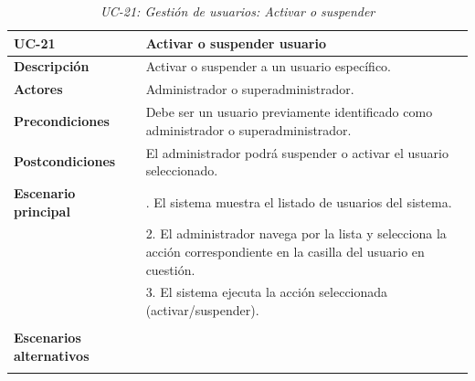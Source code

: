 \begin{table}
  \begin{center}
    \begin{tabularx}{16.4cm}{|l|X|}
      \hline
      \textbf{UC-21} & \textbf{Activar o suspender usuario}\\
      \hline
      \textbf{Descripción} & Activar o suspender a un usuario específico.\\
      \hline
      \textbf{Actores} & Administrador o superadministrador.\\
      \hline
      \textbf{Precondiciones} & Debe ser un usuario previamente identificado como administrador o superadministrador.\\
      \hline
      \textbf{Postcondiciones} & El administrador podrá suspender o activar el usuario seleccionado.\\
      \hline
      \textbf{Escenario principal} & \smallskip 1. El sistema muestra el listado de usuarios del sistema.\\
      & 2. El administrador navega por la lista y selecciona la acción correspondiente en la casilla del usuario en cuestión.\\
      & 3. El sistema ejecuta la acción seleccionada (activar/suspender).\\
      & \\
      \hline
      \textbf{Escenarios alternativos} & \\
      & \\
      \hline
    \end{tabularx}
    \caption{\textit{UC-21: Gestión de usuarios: Activar o suspender}}
    \label{tab:CU-activar-suspender-usuario}
  \end{center}
\end{table}


